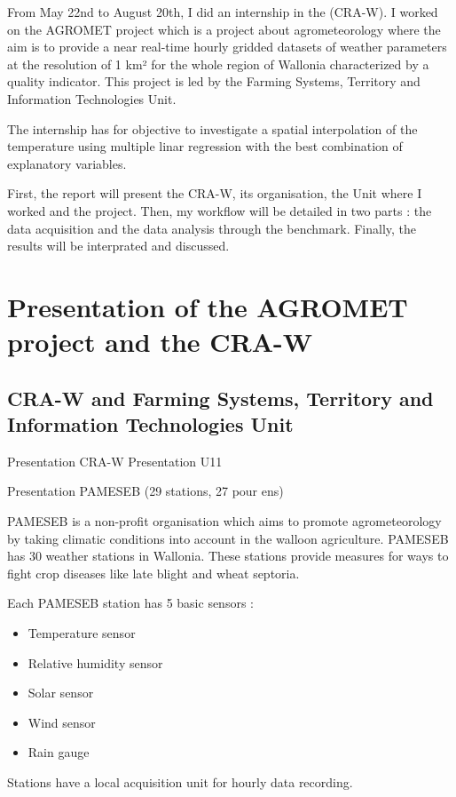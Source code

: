 \documentclass[12pt,twoside]{reedthesis}
\providecommand{\tightlist}{%
  \setlength{\itemsep}{0pt}\setlength{\parskip}{0pt}}
\theoremstyle{definition}
\theoremstyle{definition}
\theoremstyle{definition}
\theoremstyle{remark}
\begin{document}
From May 22nd to August 20th, I did an internship in the (CRA-W). I
worked on the AGROMET project which is a project about agrometeorology
where the aim is to provide a near real-time hourly gridded datasets of
weather parameters at the resolution of 1 km² for the whole region of
Wallonia characterized by a quality indicator. This project is led by
the Farming Systems, Territory and Information Technologies Unit.

The internship has for objective to investigate a spatial interpolation
of the temperature using multiple linar regression with the best
combination of explanatory variables.

First, the report will present the CRA-W, its organisation, the Unit
where I worked and the project. Then, my workflow will be detailed in
two parts : the data acquisition and the data analysis through the
benchmark. Finally, the results will be interprated and discussed.

\chapter{Presentation of the AGROMET project and the
CRA-W}\label{presentation}

\section{CRA-W and Farming Systems, Territory and Information
Technologies
Unit}\label{cra-w-and-farming-systems-territory-and-information-technologies-unit}

Presentation CRA-W Presentation U11

Presentation PAMESEB (29 stations, 27 pour ens)

PAMESEB is a non-profit organisation which aims to promote
agrometeorology by taking climatic conditions into account in the
walloon agriculture. PAMESEB has 30 weather stations in Wallonia. These
stations provide measures for ways to fight crop diseases like late
blight and wheat septoria.

Each PAMESEB station has 5 basic sensors :
\begin{itemize}
\tightlist
\item
  Temperature sensor
\item
  Relative humidity sensor
\item
  Solar sensor
\item
  Wind sensor
\item
  Rain gauge
\end{itemize}
Stations have a local acquisition unit for hourly data recording.
\end{document}

